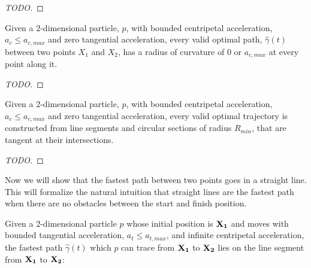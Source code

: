 \begin{proof}
[TODO]
\end{proof}

\begin{theorem}
Given a 2-dimensional particle, $p$, with bounded centripetal acceleration, $a_c \le a_{c,max}$ and zero tangential acceleration, every valid optimal path, $\hat{\gamma}(t)$ between two points $X_1$ and $X_2$, has a radius of curvature of $0$ or $a_{c,max}$ at every point along it.
\end{theorem}

\begin{proof}
[TODO]
\end{proof}

\begin{corollary}\label{corr:optimal-path-fix-s}
Given a 2-dimensional particle, $p$, with bounded centripetal acceleration, $a_c \le a_{c,max}$ and zero tangential acceleration, every valid optimal trajectory is constructed from line segments and circular sections of radius $R_{min}$, that are tangent at their intersections.
\end{corollary}

\begin{proof}
[TODO]
\end{proof}


Now we will show that the fastest path between two points goes in a straight line. This will formalize the natural intuition that straight lines are the fastest path when there are no obstacles between the start and finish position.

\begin{theorem}
  Given a 2-dimensional particle $p$ whose initial position is $\mathbf{X_1}$ and moves with bounded tangential acceleration, $a_t \le a_{t,max}$, and infinite centripetal acceleration, the fastest path $\hat{\gamma}(t)$ which $p$ can trace from $\mathbf{X_1}$ to $\mathbf{X_2}$ lies on the line segment from $\mathbf{X_1}$ to $\mathbf{X_2}$:
\end{theorem}

